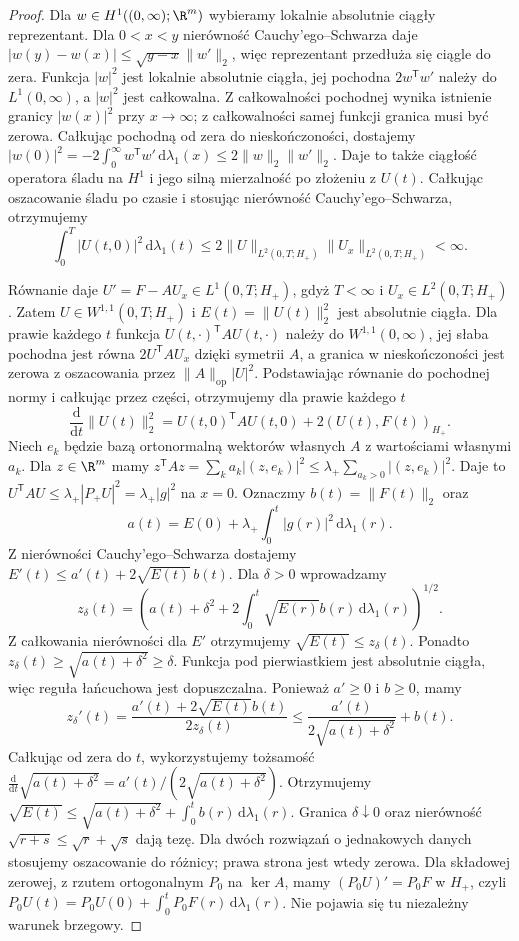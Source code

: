 \begin{proof}
Dla $w\in H^1((0,\infty);\R^m)$ wybieramy
lokalnie absolutnie ciągły reprezentant. Dla
$0<x<y$ nierówność Cauchy'ego--Schwarza daje
$|w(y)-w(x)|\le\sqrt{y-x}\|w'\|_2$,
więc reprezentant przedłuża się ciągle do zera. Funkcja $|w|^2$
jest lokalnie absolutnie ciągła, jej pochodna
$2w^\mathsf Tw'$ należy do $L^1(0,\infty)$,
a $|w|^2$ jest całkowalna. Z całkowalności
pochodnej wynika istnienie granicy $|w(x)|^2$
przy $x\to\infty$; z całkowalności samej funkcji
granica musi być zerowa. Całkując pochodną
od zera do nieskończoności, dostajemy
$|w(0)|^2=-2\int_0^\infty w^\mathsf Tw'\,
\mathrm d\lambda_1(x)\le 2\|w\|_2\|w'\|_2$.
Daje to także ciągłość operatora śladu na $H^1$
i jego silną mierzalność po złożeniu z $U(t)$.
Całkując oszacowanie śladu po czasie i stosując
nierówność Cauchy'ego--Schwarza, otrzymujemy
\[
 \int_0^T |U(t,0)|^2\,\mathrm d\lambda_1(t)
 \le 2\|U\|_{L^2(0,T;H_+)}
       \|U_x\|_{L^2(0,T;H_+)}<\infty.
\]

Równanie daje $U'=F-AU_x\in L^1(0,T;H_+)$,
gdyż $T<\infty$ i $U_x\in L^2(0,T;H_+)$.
Zatem $U\in W^{1,1}(0,T;H_+)$ i
$E(t)=\|U(t)\|_2^2$ jest absolutnie ciągła.
Dla prawie każdego $t$ funkcja
$U(t,\cdot)^\mathsf TAU(t,\cdot)$ należy do
$W^{1,1}(0,\infty)$, jej słaba pochodna jest
równa $2U^\mathsf TAU_x$ dzięki symetrii $A$,
a granica w nieskończoności jest zerowa
z oszacowania przez $\|A\|_{\mathrm{op}}|U|^2$.
Podstawiając równanie do pochodnej normy
i całkując przez części, otrzymujemy dla prawie
każdego $t$
\[
 \frac{\mathrm d}{\mathrm dt}\|U(t)\|_2^2
 =U(t,0)^{\mathsf T}AU(t,0)+
 2(U(t),F(t))_{H_+}.
\]
Niech $e_k$ będzie bazą ortonormalną wektorów
własnych $A$ z wartościami własnymi $a_k$.
Dla $z\in\R^m$ mamy
$z^\mathsf TAz=\sum_k a_k|(z,e_k)|^2
\le\lambda_+\sum_{a_k>0}|(z,e_k)|^2$.
Daje to
$U^{\mathsf T}AU\le\lambda_+|P_+U|^2
=\lambda_+|g|^2$ na $x=0$. Oznaczmy
$b(t)=\|F(t)\|_2$ oraz
\[
 a(t)=E(0)+\lambda_+\int_0^t|g(r)|^2\,\mathrm d\lambda_1(r).
\]
Z nierówności Cauchy'ego--Schwarza dostajemy
$E'(t)\le a'(t)+2\sqrt{E(t)}\,b(t)$.
Dla $\delta>0$ wprowadzamy
\[
 z_\delta(t)=\left(a(t)+\delta^2+
 2\int_0^t\sqrt{E(r)}b(r)\,\mathrm d\lambda_1(r)\right)^{1/2}.
\]
Z całkowania nierówności dla $E'$ otrzymujemy
$\sqrt{E(t)}\le z_\delta(t)$.
Ponadto $z_\delta(t)\ge\sqrt{a(t)+\delta^2}\ge\delta$.
Funkcja pod pierwiastkiem jest absolutnie ciągła,
więc reguła łańcuchowa jest dopuszczalna.
Ponieważ $a'\ge0$ i $b\ge0$, mamy
\[
 z_\delta'(t)=\frac{a'(t)+2\sqrt{E(t)}b(t)}
 {2z_\delta(t)}
 \le\frac{a'(t)}{2\sqrt{a(t)+\delta^2}}+b(t).
\]
Całkując od zera do $t$, wykorzystujemy tożsamość
$\frac{\mathrm d}{\mathrm dt}\sqrt{a(t)+\delta^2}
=a'(t)/(2\sqrt{a(t)+\delta^2})$.
Otrzymujemy
$\sqrt{E(t)}\le\sqrt{a(t)+\delta^2}+
\int_0^t b(r)\,\mathrm d\lambda_1(r)$. Granica $\delta\downarrow0$
oraz nierówność $\sqrt{r+s}\le\sqrt r+\sqrt s$
dają tezę. Dla dwóch rozwiązań o jednakowych danych
stosujemy oszacowanie do różnicy; prawa strona
jest wtedy zerowa.
Dla składowej zerowej, z rzutem ortogonalnym
$P_0$ na $\ker A$, mamy $(P_0U)'=P_0F$ w $H_+$,
czyli
$P_0U(t)=P_0U(0)+\int_0^t P_0F(r)\,\mathrm d\lambda_1(r)$.
Nie pojawia się tu niezależny warunek brzegowy.
\end{proof}


